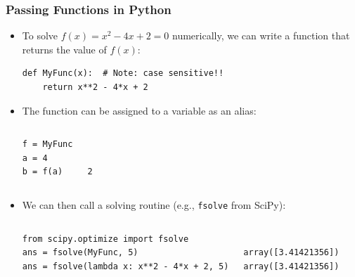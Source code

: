 
\begin{frame}[fragile]
  \frametitle{Passing Functions in Python}

  \begin{itemize}
    \item To solve \( f(x) = x^2 - 4x + 2 = 0 \) numerically, we can write a function that returns the value of \( f(x) \):
          \begin{lstlisting}
def MyFunc(x):  # Note: case sensitive!!
    return x**2 - 4*x + 2
      \end{lstlisting}
    \item The function can be assigned to a variable as an alias:
    \begin{columns}[T]
      \begin{lstlisting}
f = MyFunc
a = 4
b = f(a)
      \end{lstlisting}    
      \begin{lstlisting}[style=PyOutput]


2
      \end{lstlisting}
    \end{columns}
    \item We can then call a solving routine (e.g., \lstinline|fsolve| from SciPy):
    \begin{columns}[T]
      \begin{lstlisting}
from scipy.optimize import fsolve
ans = fsolve(MyFunc, 5)
ans = fsolve(lambda x: x**2 - 4*x + 2, 5)
      \end{lstlisting}
      \begin{lstlisting}[style=PyOutput]

array([3.41421356])
array([3.41421356])
        \end{lstlisting}
    \end{columns}
  \end{itemize}
\end{frame}

